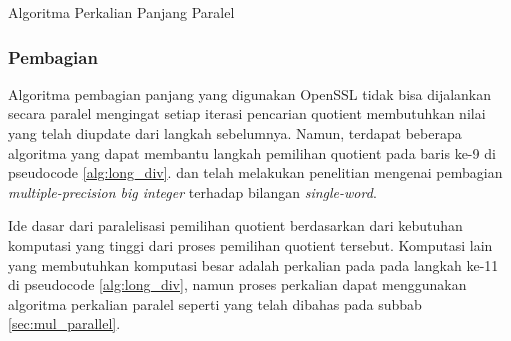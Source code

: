 \begin{algorithm}
  \caption{Algoritma Perkalian Panjang Paralel}
    \label{alg:mul_parallel}
  \begin{algorithmic}[1]
    \Statex
            \State {}
        \EndFor
      \EndFor
      \State {}
    \EndFunction
  \end{algorithmic}
\end{algorithm}

\subsubsection{Pembagian}\label{sec:div_parallel}
Algoritma pembagian panjang yang digunakan OpenSSL tidak bisa dijalankan secara paralel mengingat setiap iterasi pencarian quotient membutuhkan nilai yang telah diupdate dari langkah sebelumnya. Namun, terdapat beberapa algoritma yang dapat membantu langkah pemilihan quotient pada baris ke-9 di pseudocode \ref{alg:long_div}. \citet{parallel_short_div_emmart} dan \citet{parallel_short_div_takahashi} telah melakukan penelitian mengenai pembagian \textit{multiple-precision big integer} terhadap bilangan \textit{single-word}.

Ide dasar dari paralelisasi pemilihan quotient berdasarkan dari kebutuhan komputasi yang tinggi dari proses pemilihan quotient tersebut. Komputasi lain yang membutuhkan komputasi besar adalah perkalian pada pada langkah ke-11 di pseudocode \ref{alg:long_div}, namun proses perkalian dapat menggunakan algoritma perkalian paralel seperti yang telah dibahas pada subbab \ref{sec:mul_parallel}.

%

